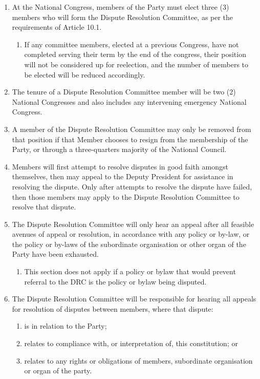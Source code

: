 \documentclass[a4paper,titlepage,8.5pt]{article}
\begin{document}
\begin{enumerate}
\item At the National Congress, members of the Party must elect three (3) members who will form the Dispute Resolution Committee, as per the requirements of Article 10.1.
\begin{enumerate}
    \item If any committee members, elected at a previous Congress, have not completed serving their term by the end of the congress, their position will not be considered up for reelection, and the number of members to be elected will be reduced accordingly.
\end{enumerate}
\item The tenure of a Dispute Resolution Committee member will be two (2) National Congresses and also includes any intervening emergency National Congress.
\item A member of the Dispute Resolution Committee may only be removed from that position if that Member chooses to resign from the membership of the Party, or through a three-quarters majority of the National Council.
\item Members will first attempt to resolve disputes in good faith amongst themselves, then may appeal to the Deputy President for assistance in resolving the dispute. Only after attempts to resolve the dispute have failed, then those members may apply to the Dispute Resolution Committee to resolve that dispute.
\item The Dispute Resolution Committee will only hear an appeal after all feasible avenues of appeal or resolution, in accordance with any policy or by-law, or the policy or by-laws of the subordinate organisation or other organ of the Party have been exhausted.
\begin{enumerate}
  \item This section does not apply if a policy or bylaw that would prevent referral to the DRC is the policy or bylaw being disputed.
\end{enumerate}
\item The Dispute Resolution Committee will be responsible for hearing all appeals for resolution of disputes between members, where that dispute:
\begin{enumerate}
\item is in relation to the Party;
\item relates to compliance with, or interpretation of, this constitution; or
\item relates to any rights or obligations of members, subordinate organisation or organ of the party.

\end{enumerate}
\end{enumerate}
\end{document}
